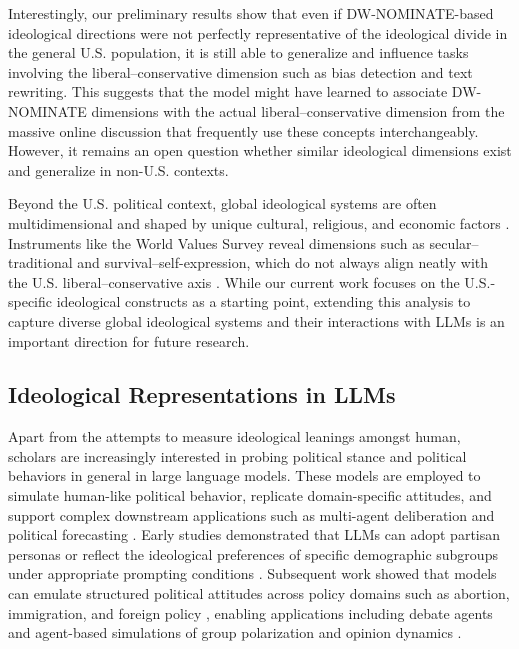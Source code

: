 \documentclass[11pt]{article}
\begin{document}
Interestingly, our preliminary results show that even if DW-NOMINATE-based ideological directions were not perfectly representative of the ideological divide in the general U.S. population, it is still able to generalize and influence tasks involving the liberal--conservative dimension such as bias detection and text rewriting. This suggests that the model might have learned to associate DW-NOMINATE dimensions with the actual liberal--conservative dimension from the massive online discussion that frequently use these concepts interchangeably. However, it remains an open question whether similar ideological dimensions exist and generalize in non-U.S. contexts.

Beyond the U.S. political context, global ideological systems are often multidimensional and shaped by unique cultural, religious, and economic factors \citep{haerpferWorldValuesSurvey2024}. Instruments like the World Values Survey reveal dimensions such as secular--traditional and survival--self-expression, which do not always align neatly with the U.S. liberal--conservative axis \citep{inglehartCulturalEvolutionPeoples2018}. While our current work focuses on the U.S.-specific ideological constructs as a starting point, extending this analysis to capture diverse global ideological systems and their interactions with LLMs is an important direction for future research.

\subsection{Ideological Representations in LLMs}

Apart from the attempts to measure ideological leanings amongst human, scholars are increasingly interested in probing political stance and political behaviors in general in large language models. These models are employed to simulate human-like political behavior, replicate domain-specific attitudes, and support complex downstream applications such as multi-agent deliberation \citep{daiArtificialLeviathanExploring2024} and political forecasting . Early studies demonstrated that LLMs can adopt partisan personas or reflect the ideological preferences of specific demographic subgroups under appropriate prompting conditions \citep{argyleOutOneMany2023, motokiMoreHumanHuman2024, potterHiddenPersuadersLLMs2024}. Subsequent work showed that models can emulate structured political attitudes across policy domains such as abortion, immigration, and foreign policy \citep{wuLargeLanguageModels2023a, ohaganMeasurementAgeLLMs2023}, enabling applications including debate agents \citep{costelloDurablyReducingConspiracy2024} and agent-based simulations of group polarization and opinion dynamics \citep{parkLinearRepresentationHypothesis2024, tornbergSimulatingSocialMedia2023, mouUnveilingTruthFacilitating2024}.
\end{document}
